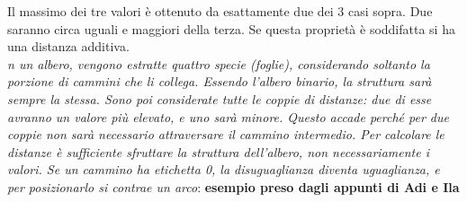 \documentclass[a4paper,12pt, oneside]{book}
\begin{document}
Il massimo dei tre valori è ottenuto da esattamente due dei 3 casi
sopra. Due saranno circa uguali e maggiori della terza. Se questa
proprietà è soddifatta si ha una distanza additiva.\\
\textit{n un albero, vengono estratte quattro specie (foglie),
  considerando soltanto la porzione di cammini che li collega. Essendo
  l’albero binario, la struttura sarà sempre la stessa. Sono poi
  considerate tutte le coppie di distanze: due di esse avranno un
  valore più elevato, e uno sarà minore. Questo accade perché per due
  coppie non sarà necessario attraversare il cammino intermedio. Per
  calcolare le distanze è sufficiente sfruttare la struttura
  dell’albero, non necessariamente i valori. Se un cammino ha
  etichetta 0, la disuguaglianza diventa uguaglianza, e per
  posizionarlo si contrae un arco}:
\newpage
\textbf{esempio preso dagli appunti di Adi e Ila}
\end{document}
